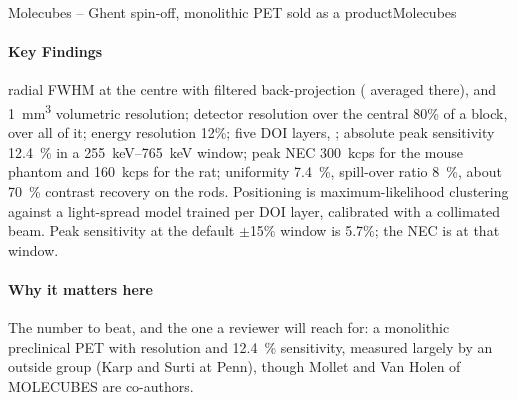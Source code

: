 \begin{programnote}{Molecubes -- Ghent spin-off, monolithic PET sold as a product}{Molecubes}
\begin{papernote}
\paragraph{Key Findings}
 radial FWHM at the centre with filtered back-projection (
averaged there), and \qty{1}{\cubic\mm} volumetric resolution; detector resolution
 over the central 80\% of a block,  over all of it; energy
resolution 12\%; five DOI layers, ; absolute peak sensitivity \qty{12.4}{\percent} in a
\qtyrange{255}{765}{\kilo\electronvolt} window; peak NEC
\qty{300}{\kilo cps} for the mouse phantom and \qty{160}{\kilo cps} for the
rat; uniformity \qty{7.4}{\percent}, spill-over ratio \qty{8}{\percent},
about \qty{70}{\percent} contrast recovery on the  rods.
Positioning is maximum-likelihood clustering against a light-spread model
trained per DOI layer, calibrated with a  collimated  beam.
Peak sensitivity at the default $\pm$15\% window is 5.7\%; the NEC is at
that window.

\paragraph{Why it matters here}
The number to beat, and the one a reviewer will reach for: a monolithic
preclinical PET with  resolution and \qty{12.4}{\percent} sensitivity,
measured largely by an outside group (Karp and Surti at Penn), though
Mollet and Van Holen of MOLECUBES are co-authors.

\end{papernote}
 
\end{programnote}
 
 
 
